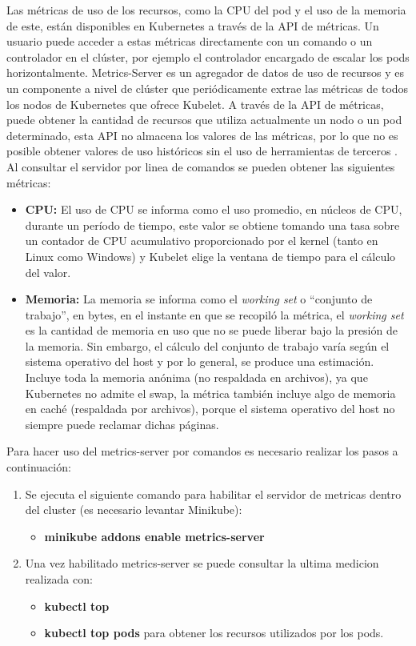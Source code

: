 \par Las métricas de uso de los recursos, como la CPU del pod y el uso de la memoria de este, están disponibles en Kubernetes a través de la API de métricas. Un usuario puede acceder a estas métricas directamente con un comando o un controlador en el clúster, por ejemplo el controlador encargado de escalar los pods horizontalmente. Metrics-Server es un agregador de datos de uso de recursos y es un componente a nivel de clúster que periódicamente extrae las métricas de todos los nodos de Kubernetes que ofrece Kubelet. A través de la API de métricas, puede obtener la cantidad de recursos que utiliza actualmente un nodo o un pod determinado, esta API no almacena los valores de las métricas, por lo que no es posible obtener valores de uso históricos sin el uso de herramientas de terceros \cite{WEB03}. Al consultar el servidor por linea de comandos se pueden obtener las siguientes métricas: 
\begin{itemize}
    \item \textbf{CPU:} El uso de CPU se informa como el uso promedio, en núcleos de CPU, durante un período de tiempo, este valor se obtiene tomando una tasa sobre un contador de CPU acumulativo proporcionado por el kernel (tanto en Linux como Windows) y Kubelet elige la ventana de tiempo para el cálculo del valor.
    \item \textbf{Memoria:} La memoria se informa como el \textit{working set} o ``conjunto de trabajo'', en bytes, en el instante en que se recopiló la métrica, el \textit{working set} es la cantidad de memoria en uso que no se puede liberar bajo la presión de la memoria. Sin embargo, el cálculo del conjunto de trabajo varía según el sistema operativo del host y por lo general, se produce una estimación. Incluye toda la memoria anónima (no respaldada en archivos), ya que Kubernetes no admite el swap, la métrica también incluye algo de memoria en caché (respaldada por archivos), porque el sistema operativo del host no siempre puede reclamar dichas páginas.
\end{itemize}

\par Para hacer uso del metrics-server por comandos es necesario realizar los pasos a continuación:
\begin{enumerate}
    \item Se ejecuta el siguiente comando para habilitar el servidor de metricas dentro del cluster (es necesario levantar Minikube):
    \begin{itemize}
        \item \textbf{minikube addons enable metrics-server}
    \end{itemize}
    \item Una vez habilitado metrics-server se puede consultar la ultima medicion realizada con:
    \begin{itemize}
        \item \textbf{kubectl top}
        \item \textbf{kubectl top pods} para obtener los recursos utilizados por los pods.
    \end{itemize}
\end{enumerate}

